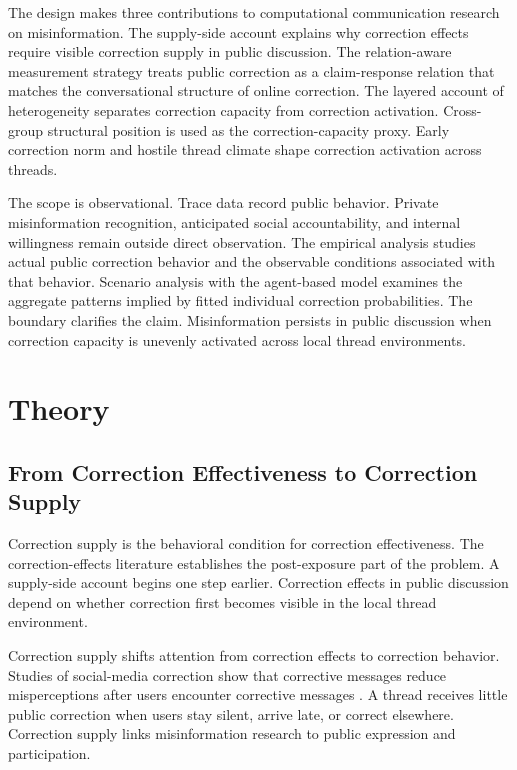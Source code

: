 \documentclass[namedate,unnumsec,webpdf,contemporary,large]{oup-authoring-template}
\begin{document}
The design makes three contributions to computational communication research on misinformation. The supply-side account explains why correction effects require visible correction supply in public discussion. The relation-aware measurement strategy treats public correction as a claim-response relation that matches the conversational structure of online correction. The layered account of heterogeneity separates correction capacity from correction activation. Cross-group structural position is used as the correction-capacity proxy. Early correction norm and hostile thread climate shape correction activation across threads.

The scope is observational. Trace data record public behavior. Private misinformation recognition, anticipated social accountability, and internal willingness remain outside direct observation. The empirical analysis studies actual public correction behavior and the observable conditions associated with that behavior. Scenario analysis with the agent-based model examines the aggregate patterns implied by fitted individual correction probabilities. The boundary clarifies the claim. Misinformation persists in public discussion when correction capacity is unevenly activated across local thread environments.

\section{Theory}

\subsection{From Correction Effectiveness to Correction Supply}


Correction supply is the behavioral condition for correction effectiveness. The correction-effects literature establishes the post-exposure part of the problem. A supply-side account begins one step earlier. Correction effects in public discussion depend on whether correction first becomes visible in the local thread environment.

Correction supply shifts attention from correction effects to correction behavior. Studies of social-media correction show that corrective messages reduce misperceptions after users encounter corrective messages \citep{bode2015related,vraga2017expert}. A thread receives little public correction when users stay silent, arrive late, or correct elsewhere. Correction supply links misinformation research to public expression and participation.
\end{document}
